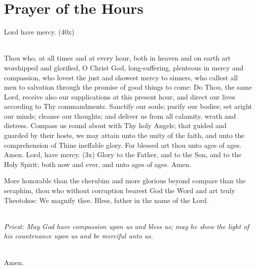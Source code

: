 {\section*{Prayer of the Hours}
Lord have mercy. (40x)

\mbox{}\\
Thou who, at all times and at every hour, both in heaven and on earth art 
worshipped and glorified, O Christ God, long-suffering, plenteous in mercy 
and compassion, who lovest the just and showest mercy to sinners, who callest 
all men to salvation through the promise of good things to come: Do Thou, the 
same Lord, receive also our supplications at this present hour, and direct our 
lives according to Thy commandments. Sanctify our souls; purify our bodies; 
set aright our minds; cleanse our thoughts; and deliver us from all calamity, 
wrath and distress. Compass us round about with Thy holy Angels; that 
guided and guarded by their hosts, we may attain unto the unity of the faith, 
and unto the comprehension of Thine ineffable glory. For blessed art thou unto 
ages of ages. Amen. 
Lord, have mercy. (3x) 
Glory to the Father, and to the Son, and to the Holy Spirit;
both now and ever, and unto ages of ages. Amen. 

More honorable than the cherubim and more glorious beyond compare than 
the seraphim, thou who without corruption bearest God the Word and art truly 
Theotokos: We magnify thee. 
Bless, father in the name of the Lord. 

\mbox{}\\
\emph{Priest: May God have compassion upon us and bless us;
may he show the light of his countenance upon us and be merciful unto us.}

\mbox{}\\
Amen. 

}

